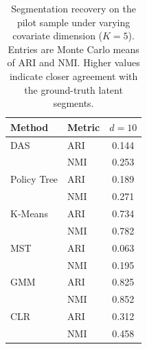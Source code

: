 \begin{table}[htbp]
\centering
\caption{Segmentation recovery on the pilot sample under varying covariate dimension ($K=5$). Entries are Monte Carlo means of ARI and NMI. Higher values indicate closer agreement with the ground-truth latent segments.}
\label{tab:app-ari-nmi-varying-d}
\begin{tabular}{llc}
\toprule
Method & Metric & $d=10$ \\
\midrule
DAS & ARI & 0.144 \\
 & NMI & 0.253 \\
\addlinespace
Policy Tree & ARI & 0.189 \\
 & NMI & 0.271 \\
\addlinespace
K-Means & ARI & 0.734 \\
 & NMI & 0.782 \\
\addlinespace
MST & ARI & 0.063 \\
 & NMI & 0.195 \\
\addlinespace
GMM & ARI & 0.825 \\
 & NMI & 0.852 \\
\addlinespace
CLR & ARI & 0.312 \\
 & NMI & 0.458 \\
\bottomrule
\end{tabular}
\end{table}
